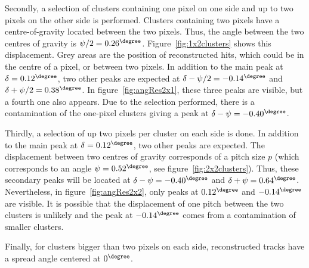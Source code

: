    Secondly, a selection of clusters containing one pixel on one side and up to two pixels on the other side is performed.
   Clusters containing two pixels have a centre-of-gravity located between the two pixels.
   Thus, the angle between the two centres of gravity is $\psi/2 = 0.26^{\degree}$.
   Figure~\ref{fig:1x2clusters} shows this displacement. 
   Grey areas are the position of reconstructed hits, which could be in the centre of a pixel, or between two pixels. 
   In addition to the main peak at $\delta = 0.12^{\degree}$, two other peaks are expected at $\delta - \psi/2 = -0.14^{\degree}$ and $\delta + \psi/2 = 0.38^{\degree}$.
   In figure~\ref{fig:angRes2x1}, these three peaks are visible, but a fourth one also appears. 
   Due to the selection performed, there is a contamination of the one-pixel clusters giving a peak at $\delta - \psi = -0.40^{\degree}$.

   Thirdly, a selection of up two pixels per cluster on each side is done.
   In addition to the main peak at $\delta = 0.12^{\degree}$, two other peaks are expected.
   The displacement between two centres of gravity corresponds of a pitch size $p$ (which corresponds to an angle $\psi = 0.52^{\degree}$, see figure~\ref{fig:2x2clusters}).
   Thus, these secondary peaks will be located at $\delta - \psi = -0.40^{\degree}$ and $\delta + \psi = 0.64^{\degree}$.
   Nevertheless, in figure~\ref{fig:angRes2x2}, only peaks at $0.12^{\degree}$ and $-0.14^{\degree}$ are visible.
   It is possible that the displacement of one pitch between the two clusters is unlikely and the peak at $-0.14^{\degree}$ comes from a contamination of smaller clusters.

   Finally, for clusters bigger than two pixels on each side, reconstructed tracks have a spread angle centered at $0^{\degree}$.
   
